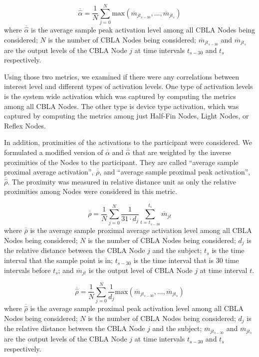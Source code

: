 \begin{equation}\label{eqn:bar_hat_alpha}
\overline{\widehat{\alpha}} = \frac{1}{N}\sum_{j=0}^{N} \text{max}(\overline{m}_{jt_{s-30}}, ... , \overline{m}_{jt_{s}})
\end{equation}
where $\overline{\widehat{\alpha}}$ is the average sample peak activation level among all CBLA Nodes being considered; $N$ is the number of CBLA Nodes being considered; $\overline{m}_{jt_{s-30}}$ and $\overline{m}_{jt_s}$ are the output levels of the CBLA Node $j$ at time intervals $t_{s-30}$ and $t_s$ respectively.

Using those two metrics, we examined if there were any correlations between interest level and different types of activation levels. One type of activation levels is the system wide activation which was captured by computing the metrics among all CBLA Nodes. The other type is device type activation, which was captured by computing the metrics among just Half-Fin Nodes, Light Nodes, or Reflex Nodes. 

In addition, proximities of the activations to the participant were considered. We formulated a modified version of $\overline{\overline{\alpha}}$ and $\overline{\widehat{\alpha}}$ that are weighted by the inverse proximities of the Nodes to the participant. They are called ``average sample proximal average activation'', $\overline{\overline{\rho}}$, and ``average sample proximal peak activation'',  $\overline{\widehat{\rho}}$. The proximity was measured in relative distance unit as only the relative proximities among Nodes were considered in this metric. 

\begin{equation}\label{eqn:bar_bar_rho}
\overline{\overline{\rho}} = \frac{1}{N}\sum_{j=0}^{N} \frac{1}{31 \cdot d_j} \sum_{t=t_{s-30}}^{t_{s}}\overline{m}_{jt}
\end{equation}
where $\overline{\overline{\rho}}$ is the average sample proximal average activation level among all CBLA Nodes being considered; $N$ is the number of CBLA Nodes being considered; $d_j$ is the relative distance between the CBLA Node $j$ and the subject; $t_s$ is the time interval that the sample point is in; $t_{s-30}$ is the time interval that is 30 time intervals before $t_s$; and $\overline{m}_{jt}$ is the output level of CBLA Node $j$ at time interval $t$. 

\begin{equation}\label{eqn:bar_hat_rho}
\overline{\widehat{\rho}} = \frac{1}{N}\sum_{j=0}^{N} \frac{1}{d_j} \text{max}(\overline{m}_{jt_{s-30}}, ... , \overline{m}_{jt_{s}})
\end{equation}
where $\overline{\widehat{\rho}}$ is the average sample proximal peak activation level among all CBLA Nodes being considered; $N$ is the number of CBLA Nodes being considered; $d_j$ is the relative distance between the CBLA Node $j$ and the subject; $\overline{m}_{jt_{s-30}}$ and $\overline{m}_{jt_{s}}$ are the output levels of the CBLA Node $j$ at time intervals $t_{s-30}$ and $t_s$ respectively.

